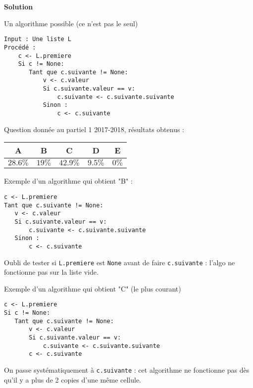 \begin{exercice}[Partiel 2017-18]
\vspace{0.5cm}

\textbf{Solution}

Un algorithme possible (ce n'est pas le seul)

\begin{lstlisting}
Input : Une liste L
Procédé :
	c <- L.premiere
	Si c != None:
	   Tant que c.suivante != None:
	       v <- c.valeur
	       Si c.suivante.valeur == v:
	           c.suivante <- c.suivante.suivante
	       Sinon :
	           c <- c.suivante
\end{lstlisting}

Question donnée au partiel 1 2017-2018, résultats obtenus :

\begin{tabular}{|c|c|c|c|c|}
\hline
A & B & C & D & E \\ \hline
$28.6\%$ & $19\%$ & $42.9\%$ & $9.5\%$ & $0\%$ \\ \hline
\end{tabular} 

\vspace{0.5cm}

Exemple d'un algorithme qui obtient "B" :

\begin{lstlisting}
c <- L.premiere
Tant que c.suivante != None:
   v <- c.valeur
   Si c.suivante.valeur == v:
       c.suivante <- c.suivante.suivante
   Sinon :
       c <- c.suivante
\end{lstlisting}

Oubli de tester si \texttt{L.premiere} est \texttt{None} avant de faire \texttt{c.suivante} : l'algo ne fonctionne pas sur la liste vide.

Exemple d'un algorithme qui obtient "C" (le plus courant)

\begin{lstlisting}
c <- L.premiere
Si c != None:
   Tant que c.suivante != None:
       v <- c.valeur
       Si c.suivante.valeur == v:
           c.suivante <- c.suivante.suivante
       c <- c.suivante
\end{lstlisting}

On passe systématiquement à \texttt{c.suivante} : cet algorithme ne fonctionne pas dès qu'il y a plus de 2 copies d'une même cellule.

\end{exercice}